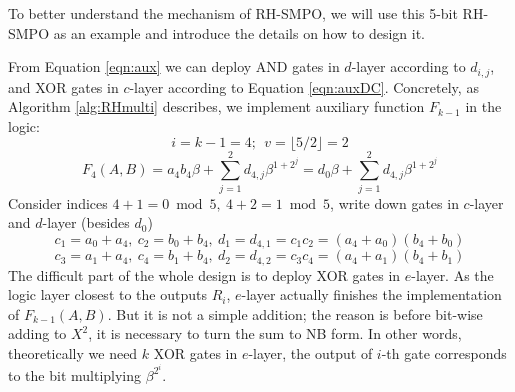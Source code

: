 To better understand the mechanism of RH-SMPO, we will use this 5-bit 
RH-SMPO as an example and introduce the details on how to design it.
\begin{Example}
From Equation \ref{eqn:aux} we can deploy AND gates in $d$-layer according to $d_{i,j}$,
and XOR gates in $c$-layer according to Equation \ref{eqn:auxDC}. Concretely, as Algorithm \ref{alg:RHmulti}
describes, we implement auxiliary function $F_{k-1}$ in the logic:
$$i = k-1 = 4;~~v=\lfloor 5/2 \rfloor = 2$$
\begin{equation}
\label{eqn:5bitRHaux}
F_{4}(A,B) = a_4b_4\beta+\sum_{j=1}^2 d_{4,j}\beta^{1+2^j} = d_0\beta+\sum_{j=1}^2 d_{4,j}\beta^{1+2^j}
\end{equation}
Consider indices $4+1=0\bmod 5,~4+2=1\bmod 5$, write down gates in $c$-layer and $d$-layer (besides $d_0$)
$$c_1 = a_0+a_4,~c_2 = b_0+b_4,~d_1=d_{4,1}= c_1c_2 = (a_4+a_0)(b_4+b_0)$$
$$c_3 = a_1+a_4,~c_4 = b_1+b_4,~d_2=d_{4,2}= c_3c_4 = (a_4+a_1)(b_4+b_1)$$
The difficult part of the whole design is to deploy XOR gates in $e$-layer. 
As the logic layer closest to the outputs $R_i$, $e$-layer actually finishes the implementation of 
$F_{k-1}(A,B)$. But it is not a simple addition; the reason is before bit-wise adding to $X^2$, it is necessary to 
turn the sum to NB form. In other words, theoretically we need $k$ XOR gates in $e$-layer, the output of 
$i$-th gate corresponds to the bit multiplying $\beta^{2^i}$.


\end{Example}
